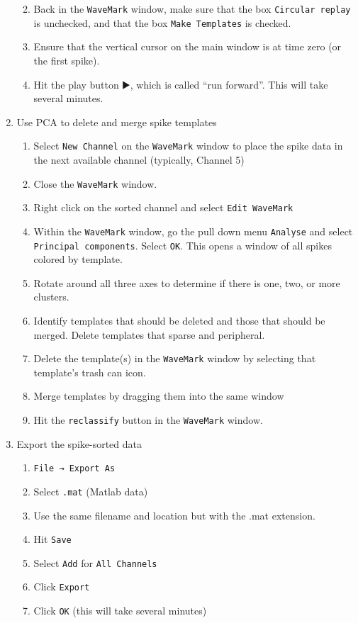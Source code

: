 \documentclass[
]{book}
\providecommand{\tightlist}{%
  \setlength{\itemsep}{0pt}\setlength{\parskip}{0pt}}
\begin{document}
\begin{enumerate}
  \begin{enumerate}
  \def\labelenumii{\arabic{enumii}.}
  \tightlist
  \item
    Back in the \texttt{WaveMark} window, make sure that the box \texttt{Circular\ replay}
    is unchecked, and that the box \texttt{Make\ Templates} is checked.
  \item
    Ensure that the vertical cursor on the main window is at time zero (or
    the first spike).
  \item
    Hit the play button ▶️, which is called ``run forward''. This will take
    several minutes.
  \end{enumerate}
\item
  Use PCA to delete and merge spike templates

  \begin{enumerate}
  \def\labelenumii{\arabic{enumii}.}
  \tightlist
  \item
    Select \texttt{New\ Channel} on the \texttt{WaveMark} window to place the spike data in
    the next available channel (typically, Channel 5)
  \item
    Close the \texttt{WaveMark} window.
  \item
    Right click on the sorted channel and select \texttt{Edit\ WaveMark}
  \item
    Within the \texttt{WaveMark} window, go the pull down menu \texttt{Analyse} and select
    \texttt{Principal\ components}. Select \texttt{OK}. This opens a window of all spikes
    colored by template.
  \item
    Rotate around all three axes to determine if there is one, two, or more
    clusters.
  \item
    Identify templates that should be deleted and those that should be
    merged. Delete templates that sparse and peripheral.
  \item
    Delete the template(s) in the \texttt{WaveMark} window by selecting that
    template's trash can icon.
  \item
    Merge templates by dragging them into the same window
  \item
    Hit the \texttt{reclassify} button in the \texttt{WaveMark} window.
  \end{enumerate}
\item
  Export the spike-sorted data

  \begin{enumerate}
  \def\labelenumii{\arabic{enumii}.}
  \tightlist
  \item
    \texttt{File\ →\ Export\ As}
  \item
    Select \texttt{.mat} (Matlab data)
  \item
    Use the same filename and location but with the .mat extension.
  \item
    Hit \texttt{Save}
  \item
    Select \texttt{Add} for \texttt{All\ Channels}
  \item
    Click \texttt{Export}
  \item
    Click \texttt{OK} (this will take several minutes)
  \end{enumerate}
\end{enumerate}
\end{document}
